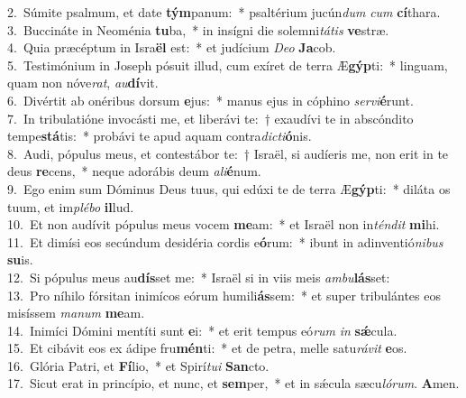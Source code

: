 {2.~}Súmite psalmum, et date \textbf{tým}panum:~* psaltérium jucún\textit{dum} \textit{cum} \textbf{cí}thara.\\
{3.~}Buccináte in Neoménia \textbf{tu}ba,~* in insígni die solemni\textit{tá}\textit{tis} \textbf{ve}stræ.\\
{4.~}Quia præcéptum in Isra\textbf{ël} est:~* et judícium \textit{De}\textit{o} \textbf{Ja}cob.\\
{5.~}Testimónium in Joseph pósuit illud, cum exíret de terra Æ\textbf{gýp}ti:~* linguam, quam non nóve\textit{rat}, \textit{au}\textbf{dí}vit.\\
{6.~}Divértit ab onéribus dorsum \textbf{e}jus:~* manus ejus in cóphino \textit{ser}\textit{vi}\textbf{é}runt.\\
{7.~}In tribulatióne invocásti me, et liberávi te:~† exaudívi te in abscóndito tempe\textbf{stá}tis:~* probávi te apud aquam contra\textit{di}\textit{cti}\textbf{ó}nis.\\
{8.~}Audi, pópulus meus, et contestábor te:~† Israël, si audíeris me, non erit in te deus \textbf{re}cens,~* neque adorábis deum \textit{a}\textit{li}\textbf{é}num.\\
{9.~}Ego enim sum Dóminus Deus tuus, qui edúxi te de terra Æ\textbf{gýp}ti:~* diláta os tuum, et im\textit{plé}\textit{bo} \textbf{il}lud.\\
{10.~}Et non audívit pópulus meus vocem \textbf{me}am:~* et Israël non in\textit{tén}\textit{dit} \textbf{mi}hi.\\
{11.~}Et dimísi eos secúndum desidéria cordis e\textbf{ó}rum:~* ibunt in adinventió\textit{ni}\textit{bus} \textbf{su}is.\\
{12.~}Si pópulus meus au\textbf{dís}set me:~* Israël si in viis meis \textit{am}\textit{bu}\textbf{lás}set:\\
{13.~}Pro níhilo fórsitan inimícos eórum humili\textbf{ás}sem:~* et super tribulántes eos misíssem \textit{ma}\textit{num} \textbf{me}am.\\
{14.~}Inimíci Dómini mentíti sunt \textbf{e}i:~* et erit tempus eó\textit{rum} \textit{in} \textbf{sǽ}cula.\\
{15.~}Et cibávit eos ex ádipe fru\textbf{mén}ti:~* et de petra, melle satu\textit{rá}\textit{vit} \textbf{e}os.\\
{16.~}Glória Patri, et \textbf{Fí}lio,~* et Spirí\textit{tu}\textit{i} \textbf{San}cto.\\
{17.~}Sicut erat in princípio, et nunc, et \textbf{sem}per,~* et in sǽcula sæcu\textit{ló}\textit{rum}. \textbf{A}men.\\
